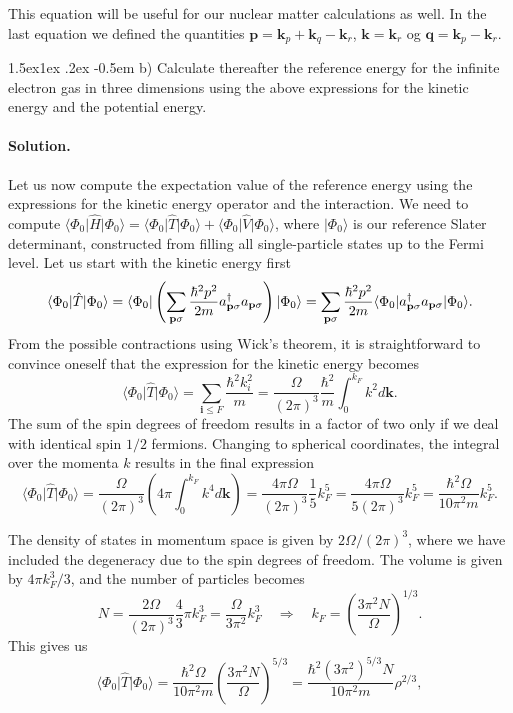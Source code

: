 \documentclass[%
oneside,                 %
final,                   %
10pt]{article}
\makeatletter
\newenvironment{doconceexercise}{}{}
\newcommand\subex{\@startsection{paragraph}{4}{\z@}%
                  {1.5ex\@plus1ex \@minus.2ex}%
                  {-0.5em}%
                  {\normalfont\normalsize\bfseries}}
\makeatother
\begin{document}
\begin{doconceexercise}
This equation will be useful for our nuclear matter calculations as well. In the last equation we defined
the quantities
$\mathbf{p} = \mathbf{k}_p + \mathbf{k}_q - \mathbf{k}_r$, $\mathbf{k} = \mathbf{k}_r$ og $\mathbf{q} = \mathbf{k}_p - \mathbf{k}_r$.


\subex{b)}
Calculate thereafter the reference energy for the infinite electron gas in three dimensions using the above expressions for the kinetic energy and the potential energy.


\paragraph{Solution.}
Let us now compute the expectation value of the reference energy using the expressions for the kinetic energy operator and the interaction.
We need to compute $\langle \Phi_0\vert \hat{H} \vert \Phi_0\rangle = \langle \Phi_0\vert \hat{T} \vert \Phi_0\rangle + \langle \Phi_0\vert \hat{V} \vert \Phi_0\rangle$, where $\vert \Phi_0\rangle$ is our reference Slater determinant, constructed from filling all single-particle states up to the Fermi level.
Let us start with the kinetic energy first
\[ \langle \Phi_0\vert \hat{T} \vert \Phi_0\rangle 
= \langle \Phi_0\vert \left( \sum_{\mathbf{p} \sigma} \frac{\hbar^2 p^2}{2m} a_{\mathbf{p} \sigma}^\dagger a_{\mathbf{p} \sigma} \right) \vert \Phi_0\rangle \\
= \sum_{\mathbf{p} \sigma} \frac{\hbar^2 p^2}{2m} \langle \Phi_0\vert a_{\mathbf{p} \sigma}^\dagger a_{\mathbf{p} \sigma} \vert \Phi_0\rangle . \]
From the possible contractions using Wick's theorem, it is straightforward to convince oneself that the expression for the kinetic energy becomes
\[ \langle \Phi_0\vert \hat{T} \vert \Phi_0\rangle = \sum_{\mathbf{i} \leq F} \frac{\hbar^2 k_i^2}{m} = \frac{\Omega}{(2\pi)^3} \frac{\hbar^2}{m} \int_0^{k_F} k^2 d\mathbf{k}.
\]
The sum of the spin degrees of freedom results in  a factor of two only if we deal with identical spin $1/2$ fermions. 
Changing to spherical coordinates, the integral over the momenta $k$ results in the final expression
\[ \langle \Phi_0\vert \hat{T} \vert \Phi_0\rangle = \frac{\Omega}{(2\pi)^3} \left( 4\pi \int_0^{k_F} k^4 d\mathbf{k} \right) = \frac{4\pi\Omega}{(2\pi)^3} \frac{1}{5} k_F^5 = \frac{4\pi\Omega}{5(2\pi)^3} k_F^5 = \frac{\hbar^2 \Omega}{10\pi^2 m} k_F^5 . \]

The density of states in momentum space is given by $2\Omega/(2\pi)^3$, where we have included the degeneracy due to the spin degrees of freedom.
The volume is given by  $4\pi k_F^3/3$, and the number of particles becomes
\[ N = \frac{2\Omega}{(2\pi)^3} \frac{4}{3} \pi k_F^3 = \frac{\Omega}{3\pi^2} k_F^3 \quad \Rightarrow \quad
k_F = \left( \frac{3\pi^2 N}{\Omega} \right)^{1/3}. \]
This gives us
\begin{equation}
\langle \Phi_0\vert \hat{T} \vert \Phi_0\rangle =
\frac{\hbar^2 \Omega}{10\pi^2 m} \left( \frac{3\pi^2 N}{\Omega} \right)^{5/3} =
\frac{\hbar^2 (3\pi^2)^{5/3} N}{10\pi^2 m} \rho^{2/3} ,
\label{eq:T_forventning}
\end{equation}


\end{doconceexercise}
\end{document}
